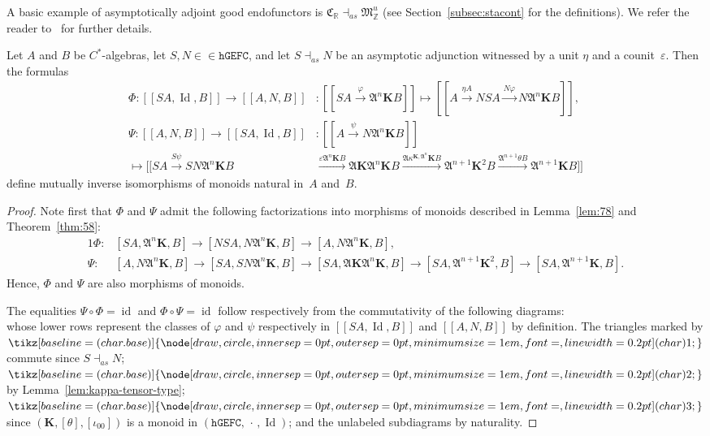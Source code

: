 \documentclass[10pt]{simplearticle}
\newcommand{\tikzinput}[1]{}
\newcommand{\tcbase}[1]{%
  \mathord{%
    \tikz[baseline=(char.base)]{
      \node[draw,circle,inner sep=0pt,outer sep=0pt,minimum size=1em,font=\small,line width=0.2pt] (char) {#1};
    }%
  }%
}
\newcommand{\id}{\operatorname{id}}
\newcommand{\Id}{\operatorname{Id}}
\newcommand{\hGEFC}{\mathtt{hGEFC}}
\newcommand{\C}{\mathfrak{C}^{\,}}
\newcommand{\asadj}{\dashv_{as}}
\newcommand{\tc}[1]{\tcbase{#1}}
\newcommand{\fK}{\mathbf{K}}
\newcommand{\myllbracket}{[[}
\newcommand{\myrrbracket}{]]}
\newcommand{\bbrackets}[1]{\myllbracket#1\myrrbracket}
\newcommand{\singledot}{\,\cdot\,}
\begin{document}
\begin{example}\label{exa:asadj}
A basic example of asymptotically adjoint good endofunctors
is $\C_{\mathbb{R}}\asadj\mathfrak{M}^{u}_{\mathbb{Z}}$ (see Section~\ref{subsec:stacont}
for the definitions). We refer the reader to~\cite{makeev_asadj}
for further details.
\end{example}

\begin{thm}\label{thm:adj2brackets}
Let $A$ and $B$ be $C^{*}$-algebras, let
$S,N\in\in\hGEFC$, and let $S\asadj N$ be an asymptotic adjunction
witnessed by a unit $\eta$ and a counit~$\varepsilon$. Then the
formulas
\begin{align}
\Phi\colon\bbrackets{SA,\Id,B}\to\bbrackets{A,N,B} & \colon\bbrackets{SA\xrightarrow{\varphi}\mathfrak{A}^{n}\fK B}\mapsto\bbrackets{A\xrightarrow{\eta A}NSA\xrightarrow{N\varphi}N\mathfrak{A}^{n}\fK B},\label{eq:mut-izom}\\
\Psi\colon\bbrackets{A,N,B}\to\bbrackets{SA,\Id,B} & \colon\bbrackets{A\xrightarrow{\psi}N\mathfrak{A}^{n}\fK B}\nonumber \\
\mapsto\myllbracket SA\xrightarrow{S\psi}SN\mathfrak{A}^{n}\fK B & \xrightarrow{\varepsilon\mathfrak{A}^{n}\fK B}\mathfrak{A}\fK\mathfrak{A}^{n}\fK B\xrightarrow{\mathfrak{A}\kappa^{\fK,\mathfrak{A}^{n}}\fK B}\mathfrak{A}^{n+1}\fK^{2}B\xrightarrow{\mathfrak{A}^{n+1}\theta B}\mathfrak{A}^{n+1}\fK B\myrrbracket\nonumber
\end{align}
define mutually inverse isomorphisms of monoids natural in~$A$ and~$B$.
\end{thm}

\begin{proof}
Note first that $\Phi$ and $\Psi$ admit the following factorizations
into morphisms of monoids described in Lemma~\ref{lem:78} and Theorem~\ref{thm:58}:
\begin{alignat*}{1}
\Phi\colon & [SA,\mathfrak{A}^{n}\fK,B]\to[NSA,N\mathfrak{A}^{n}\fK,B]\to[A,N\mathfrak{A}^{n}\fK,B],\\
\Psi\colon & [A,N\mathfrak{A}^{n}\fK,B]\to[SA,SN\mathfrak{A}^{n}\fK,B]\to[SA,\mathfrak{A}\fK\mathfrak{A}^{n}\fK,B]\to[SA,\mathfrak{A}^{n+1}\fK^{2},B]\to[SA,\mathfrak{A}^{n+1}\fK,B].
\end{alignat*}
Hence, $\Phi$ and $\Psi$ are also morphisms of monoids.

The equalities $\Psi\circ\Phi=\id$ and $\Phi\circ\Psi=\id$ follow
respectively from the commutativity of the following
diagrams:
\[
\tikzinput{d308}
\]
\[
\tikzinput{d309}
\]
whose lower rows represent the classes of $\varphi$ and $\psi$ respectively
in $\bbrackets{SA,\Id,B}$ and $\bbrackets{A,N,B}$ by definition.
The triangles marked by $\tc 1$ commute since $S\asadj N$; $\tc 2$
by Lemma~\ref{lem:kappa-tensor-type}; $\tc 3$ since $(\fK,[\theta],[\iota_{00}])$
is a monoid in $(\hGEFC,\singledot,\Id)$; and the unlabeled subdiagrams
by naturality.
\end{proof}
\end{document}
